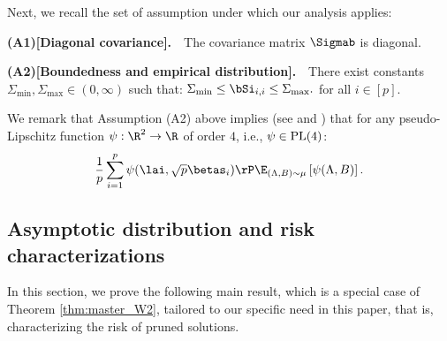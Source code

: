 \vspace{5pt}
Next, we recall the set of assumption under which our analysis applies:



%
\vp
\textbf{(A1)[Diagonal covariance].}~~The covariance matrix $\Sigmab$ is diagonal.

%
\vp
\textbf{(A2)[Boundedness and empirical distribution].}~~There exist constants $\Sigma_{\min},\Sigma_{\max}\in(0,\infty)$ such that:
$
\Sigma_{\min}\leq\bSi_{i,i}\leq \Sigma_{\max}.
$
for all $i\in[p].$ 



\noindent We remark that Assumption (A2) above implies (see \cite[Lem.~4]{bayati2011dynamics} and \cite[Lem.~A3]{javanmard2013state}) that for any pseudo-Lipschitz function $\psi:\R^2\rightarrow\R$ of order $4$, i.e., $\psi\in\rm{PL}(4)$:
$$
\frac{1}{p}\sum_{i=1}^p\psi(\lai,\sqrt{p}\betas_i) \rP \E_{(\Lambda,B)\sim\mu}\left[ \psi(\Lambda,B)\right].
$$




\subsection{Asymptotic distribution and risk characterizations}
In this section, we prove the following main result, which is a special case of Theorem \ref{thm:master_W2}, tailored to our specific need in this paper, that is, characterizing the risk of pruned solutions.

